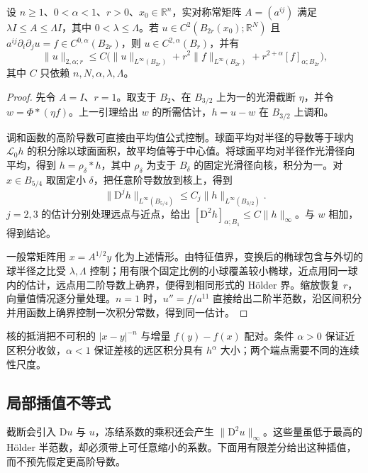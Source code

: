 \begin{theorem}\label{g3:thm:constant-schauder}
	设 \(n\ge1\)、\(0<\alpha<1\)、\(r>0\)、\(x_0\in\mathbb R^n\)，实对称常矩阵 \(A=(a^{ij})\) 满足 \(\lambda I\le A\le\Lambda I\)，其中 \(0<\lambda\le\Lambda\)。若 \(u\in C^2(B_{2r}(x_0);\mathbb R^N)\) 且
	\(a^{ij}\partial_i\partial_j u=f\in C^{0,\alpha}(B_{2r})\)，则 \(u\in C^{2,\alpha}(B_r)\)，并有
	\begin{equation}\label{g3:eq:constant-schauder}
		\|u\|_{2,\alpha;r}
		\le C\bigl(\|u\|_{L^\infty(B_{2r})}
		+r^2\|f\|_{L^\infty(B_{2r})}
		+r^{2+\alpha}[f]_{\alpha;B_{2r}}\bigr),
	\end{equation}
	其中 \(C\) 只依赖 \(n,N,\alpha,\lambda,\Lambda\)。
\end{theorem}
\begin{proof}
	先令 \(A=I\)、\(r=1\)。取支于 \(B_2\)、在 \(B_{3/2}\) 上为一的光滑截断 \(\eta\)，并令 \(w=\Phi*(\eta f)\)。上一引理给出 \(w\) 的所需估计，\(h=u-w\) 在 \(B_{3/2}\) 上调和。

	调和函数的高阶导数可直接由平均值公式控制。球面平均对半径的导数等于球内 \(\mathcal L_0h\) 的积分除以球面面积，故平均值等于中心值。将球面平均对半径作光滑径向平均，得到 \(h=\rho_\delta*h\)，其中 \(\rho_\delta\) 为支于 \(B_\delta\) 的固定光滑径向核，积分为一。对 \(x\in B_{5/4}\) 取固定小 \(\delta\)，把任意阶导数放到核上，得到
	\[
		\|\mathrm D^jh\|_{L^\infty(B_{5/4})}
		\le C_j\|h\|_{L^\infty(B_{3/2})}.
	\]
	\(j=2,3\) 的估计分别处理远点与近点，给出 \([\mathrm D^2h]_{\alpha;B_1}\le C\|h\|_\infty\)。与 \(w\) 相加，得到结论。

	一般常矩阵用 \(x=A^{1/2}y\) 化为上述情形。由特征值界，变换后的椭球包含与外切的球半径之比受 \(\lambda,\Lambda\) 控制；用有限个固定比例的小球覆盖较小椭球，近点用同一球内的估计，远点用二阶导数上确界，便得到相同形式的 Hölder 界。缩放恢复 \(r\)，向量值情况逐分量处理。\(n=1\) 时，\(u''=f/a^{11}\) 直接给出二阶半范数，沿区间积分并用函数上确界控制一次积分常数，得到同一估计。
\end{proof}

核的抵消把不可积的 \(|x-y|^{-n}\) 与增量 \(f(y)-f(x)\) 配对。条件 \(\alpha>0\) 保证近区积分收敛，\(\alpha<1\) 保证差核的远区积分具有 \(h^\alpha\) 大小；两个端点需要不同的连续性尺度。

\subsection{局部插值不等式}
\label{g3:subsec:1205:03}
截断会引入 \(\mathrm Du\) 与 \(u\)，冻结系数的乘积还会产生 \(\|\mathrm D^2u\|_\infty\)。这些量虽低于最高的 Hölder 半范数，却必须带上可任意缩小的系数。下面用有限差分给出这种插值，而不预先假定更高阶导数。

